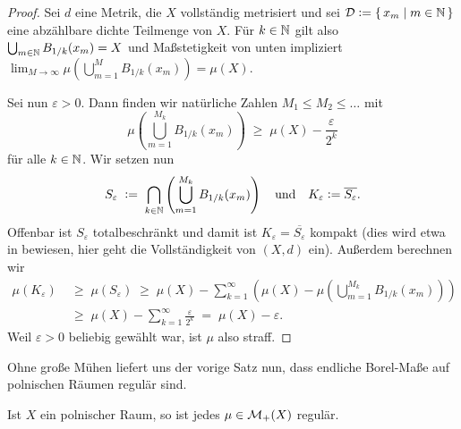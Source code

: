 \documentclass[../main/main.tex]{subfiles}
\begin{document}
	\begin{proof}
		Sei $d$ eine Metrik, die $X$ vollständig metrisiert und sei 
		$\mathcal{D} \vcentcolon = \left\{\, x_m \; \middle| \; m \in \mathbb{N} \,\right\}$ eine abzählbare dichte Teilmenge von $X$. 
		Für $k \in \mathbb{N}$ gilt also $\bigcup_{m \in \mathbb{N}} B_{1/k}(x_m) = X$ und Maßstetigkeit 
		von unten impliziert 
		$\lim_{M \to \infty} \mu(\bigcup_{m=1}^{M} B_{1/k}(x_m)) = \mu(X)$.
		
		Sei nun $\varepsilon > 0$. Dann finden wir natürliche Zahlen $M_1 \leq M_2 \leq \dots$ mit
		\[ \mu\left( \bigcup_{m=1}^{M_k} B_{1/k}(x_m) \right) \; \geq \; \mu(X) - \frac{\varepsilon}{2^k} \]
		für alle $k \in \mathbb{N}$. Wir setzen nun
		\[ S_\varepsilon 
		\; \vcentcolon = \; \bigcap_{k \in \mathbb{N}} \left( \bigcup_{m=1}^{M_k} B_{1/k}(x_m) \right) 
		\quad \text{und} \quad K_\varepsilon \vcentcolon = \overline{S_\varepsilon} \text{.} \]
		Offenbar ist $S_\varepsilon$ totalbeschränkt und damit ist $K_\varepsilon = \overline{S_\varepsilon}$ 
		kompakt (dies wird etwa in \cite[Satz 2.3.8]{Simon.2015} bewiesen, 
		hier geht die Vollständigkeit von $(X, d)$ ein).
		Außerdem berechnen wir
		\begin{align*}
			\mu(K_\varepsilon) \; &\geq \; \mu(S_\varepsilon) 
			\; \geq \; \mu(X) - \sum_{k=1}^{\infty} \left( \mu(X) - \mu\left( \bigcup_{m=1}^{M_k} B_{1/k}(x_m) \right) \right) \\
			\; &\geq \; \mu(X) - \sum_{k=1}^{\infty} \frac{\varepsilon}{2^k} \; = \; \mu(X) - \varepsilon \text{.}
		\end{align*} 
		Weil $\varepsilon > 0$ beliebig gewählt war, ist $\mu$ also straff.
	\end{proof}
	
	Ohne große Mühen liefert uns der vorige Satz nun, dass endliche Borel-Maße auf polnischen Räumen regulär sind.
	
	\begin{Folgerung}
		\label{kor:polishregular}
		Ist $X$ ein polnischer Raum, so ist jedes $\mu \in \mathcal{M}_{+}(X)$ regulär.
	\end{Folgerung}
	
\end{document}
